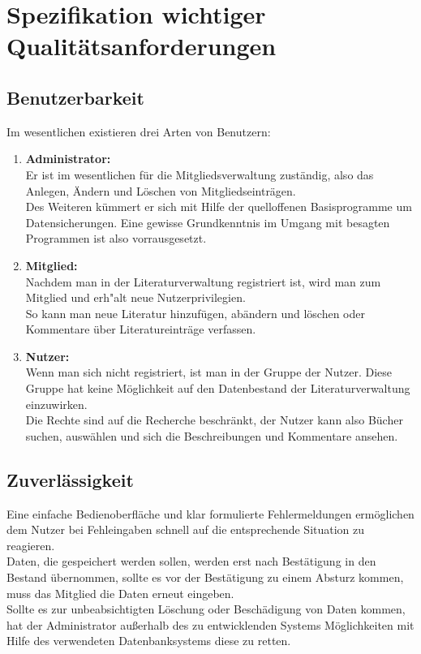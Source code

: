 \chapter{Spezifikation wichtiger Qualitätsanforderungen}
\section{Benutzerbarkeit}
Im wesentlichen existieren drei Arten von Benutzern:

\begin{enumerate}
 \item \textbf{Administrator:}\\
Er ist im wesentlichen f\"ur die Mitgliedsverwaltung zust\"andig, also das Anlegen, \"Andern und L\"oschen von Mitgliedseintr\"agen. \\
Des Weiteren k\"ummert er sich mit Hilfe der quelloffenen Basisprogramme um Datensicherungen. Eine gewisse Grundkenntnis im Umgang mit
besagten Programmen ist also vorrausgesetzt.

 \item \textbf{Mitglied:}\\
Nachdem man in der Literaturverwaltung registriert ist, wird man zum Mitglied und erh"alt neue Nutzerprivilegien. \\
So kann man neue Literatur hinzuf\"ugen, ab\"andern und l\"oschen oder Kommentare \"uber Literatureintr\"age verfassen.

 \item \textbf{Nutzer:}\\
Wenn man sich nicht registriert, ist man in der Gruppe der Nutzer. Diese Gruppe hat keine M\"oglichkeit auf den Datenbestand der Literaturverwaltung einzuwirken.\\
Die Rechte sind auf die Recherche beschr\"ankt, der Nutzer kann also B\"ucher suchen, ausw\"ahlen und sich die Beschreibungen und Kommentare ansehen.
\end{enumerate}

\section{Zuverlässigkeit}
Eine einfache Bedienoberfl\"ache und klar formulierte Fehlermeldungen erm\"oglichen dem Nutzer bei Fehleingaben schnell auf die entsprechende Situation zu reagieren.\\
Daten, die gespeichert werden sollen, werden erst nach Best\"atigung in den Bestand \"ubernommen, sollte es vor der Best\"atigung zu einem Absturz kommen, muss das Mitglied die Daten erneut eingeben. \\
Sollte es zur unbeabsichtigten L\"oschung oder Besch\"adigung von Daten kommen, hat der Administrator au\ss erhalb des zu entwicklenden Systems M\"oglichkeiten mit Hilfe des verwendeten Datenbanksystems diese zu retten.

